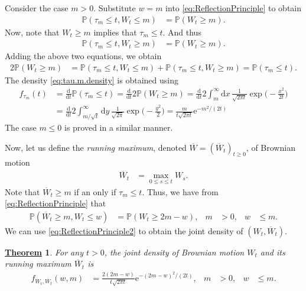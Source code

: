 \documentclass[12pt]{book}
\numberwithin{equation}{chapter}
\theoremstyle{plain}
\newtheorem{theorem}{\underline{Theorem}}
\numberwithin{theorem}{section}
\theoremstyle{definition}
\numberwithin{exercise}{chapter}
\let\oldendproof\endproof
\renewenvironment{proof}[1][\proofname]{%
  \oldproof[\scshape\underline{#1}]%
}{\oldendproof}
\newcommand{\<}{\langle}
\renewcommand{\>}{\rangle}
\renewcommand{\(}{\left(}
\renewcommand{\)}{\right)}
\renewcommand{\[}{\left[}
\renewcommand{\]}{\right]}
\newcommand\Pb{\mathds{P}}
\newcommand\Nc{\mathscr{N}}
\newcommand\Wb{\overline{W}}
\newcommand\dd{\mathrm{d}}
\newcommand\ee{\mathrm{e}}
\begin{document}
\begin{proof}
Consider the case $m>0$.  Substitute $w=m$ into \eqref{eq:ReflectionPrinciple} to obtain
\begin{align}
\Pb( \tau_m \leq t, W_t \leq m )
	&= \Pb( W_t \geq m ) .
\end{align}
Now, note that $W_t \geq m$ implies that $\tau_m \leq t$.  And thus
\begin{align}
\Pb( \tau_m \leq t, W_t \geq m )
	&= \Pb( W_t \geq m ) .
\end{align}
Adding the above two equations, we obtain
\begin{align}
2 \Pb( W_t \geq m )
	&=	\Pb( \tau_m \leq t, W_t \leq m ) + \Pb( \tau_m \leq t, W_t \geq m )
	=		\Pb( \tau_m \leq t ) .
\end{align}
The density \eqref{eq:tau.m.density} is obtained using
\begin{align}
f_{\tau_m}(t)
	&=	\frac{\dd}{\dd t} \Pb( \tau_m \leq t )
	=		\frac{\dd}{\dd t} 2 \Pb( W_t \geq m )
	=		\frac{\dd}{\dd t} 2 \int_m^\infty \dd x \, \frac{1}{\sqrt{2 \pi t}} \exp \Big( - \frac{x^2}{2t} \big) \\
	&=	\frac{\dd}{\dd t} 2 \int_{m/\sqrt{t}}^\infty \dd y \, \frac{1}{\sqrt{2 \pi }} \exp \Big( - \frac{y^2}{2} \big) 
	=		\frac{m}{t\sqrt{2\pi t}}\ee^{-m^2/(2t)}
\end{align}
The case $m \leq 0$ is proved in a similar manner.
\end{proof}

\noindent
Now, let us define the \emph{running maximum}, denoted $\Wb=(\Wb_t)_{t \geq 0}$, of Brownian motion
\begin{align}
\Wb_t
	&=	\max_{0 \leq s \leq t} W_s .
\end{align}
Note that $\Wb_t \geq m$ if an only if $\tau_m \leq t$.  Thus, we have from \eqref{eq:ReflectionPrinciple} that
\begin{align}
\Pb( \Wb_t \geq m , W_t \leq w)
	&=	\Pb(W_t \geq 2m-w) , &
m
	&> 0 , &
w
	&\leq m . \label{eq:ReflectionPrinciple2}
\end{align}
We can use \eqref{eq:ReflectionPrinciple2} to obtain the joint density of $(W_t,\Wb_t)$.

\begin{theorem}
For any $t>0$, the joint density of Brownian motion $W_t$ and its running maximum $\Wb_t$ is 
\begin{align}
f_{W_t,\Wb_t}(w,m)
	&=	\frac{2(2m-w)}{t \sqrt{2\pi t}} \ee^{-(2m-w)^2/(2t)} , &
m
	&>0 , &
w
	&\leq m . \label{eq:joint.density}
\end{align}
\end{theorem}
\end{document}
